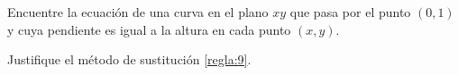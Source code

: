  \begin{resuelto}
 \label{soc:solved:22.20}
  Encuentre la ecuaci\'on de una curva en el plano $xy$ que pasa por el punto $(0,1)$ y cuya pendiente es igual a la altura en cada punto $(x,y).$
 \end{resuelto}




 \begin{resuelto}
  \label{soc:solved:22.21}
  Justifique el método de sustituci\'on \eqref{regla:9}.
 \end{resuelto}



%
%


%
%
%
%
%
